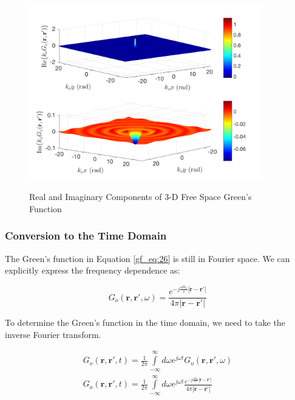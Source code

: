 \begin{figure}[ht]
\begin{center}
\includegraphics[width=4in]{../media/3d_fs_gf_re_im.png}
\end{center}
\renewcommand{\baselinestretch}{1}
\small\normalsize
\begin{quote}
\caption[Real and Imaginary Components of 3-D Free Space Green's Function]{Real and Imaginary Components of 3-D Free Space Green's Function \label{gf_fig:2}}
\end{quote}
\end{figure} 
\renewcommand{\baselinestretch}{2}
\small\normalsize

\subsubsection {Conversion to the Time Domain}
The Green's function in Equation \ref{gf_eq:26} is still in Fourier space. We can explicitly express the frequency dependence as:

\begin{equation}
G_o\left(\mathbf{r},\mathbf{r}',\omega\right) = \frac{e^{-j\frac{\omega n_r}{c}|\mathbf{r} - \mathbf{r}'|}}{4\pi |\mathbf{r} - \mathbf{r}'|}
\label{gf_eq:28}
\end{equation}
\renewcommand{\baselinestretch}{2} \small\normalsize

\noindent To determine the Green's function in the time domain, we need to take the inverse Fourier transform.

\begin{equation}
\begin{gathered}
G_o\left(\mathbf{r},\mathbf{r}',t\right) = \frac{1}{2\pi}\int\limits_{-\infty}^{\infty}d\omega e^{j\omega t}G_o\left(\mathbf{r},\mathbf{r}',\omega\right) \\
G_o\left(\mathbf{r},\mathbf{r}',t\right) = \frac{1}{2\pi}\int\limits_{-\infty}^{\infty}d\omega e^{j\omega t}  \frac{e^{-j\frac{\omega n_r}{c}|\mathbf{r}-\mathbf{r}'|}}{4\pi |\mathbf{r}-\mathbf{r}'|}\\
\end{gathered}
\label{gf_eq:29}
\end{equation}
\renewcommand{\baselinestretch}{2} \small\normalsize

